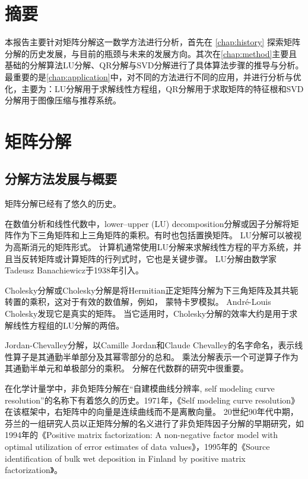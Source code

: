 \documentclass{ctexrep}
\begin{document}
\chapter{摘要}
本报告主要针对矩阵分解这一数学方法进行分析，首先在 \autoref{chap:history} 探索矩阵分解的历史发展，与目前的瓶颈与未来的发展方向。其次在\autoref{chap:method}主要且基础的分解算法LU分解、QR分解与SVD分解进行了具体算法步骤的推导与分析。最重要的是\autoref{chap:application}中，对不同的方法进行不同的应用，并进行分析与优化，主要为：LU分解用于求解线性方程组，QR分解用于求取矩阵的特征根和SVD分解用于图像压缩与推荐系统。






\chapter{矩阵分解}
\label{chap:history}
\section{分解方法发展与概要}
矩阵分解已经有了悠久的历史。\cite{matrix_jiqi}

在数值分析和线性代数中，lower–upper (LU) decomposition分解或因子分解将矩阵作为下三角矩阵和上三角矩阵的乘积。有时也包括置换矩阵。 LU分解可以被视为高斯消元的矩阵形式。 计算机通常使用LU分解来求解线性方程的平方系统，并且当反转矩阵或计算矩阵的行列式时，它也是关键步骤。 LU分解由数学家Tadeusz Banachiewicz于1938年引入。

Cholesky分解或Cholesky分解是将Hermitian正定矩阵分解为下三角矩阵及其共轭转置的乘积，这对于有效的数值解，例如， 蒙特卡罗模拟。 André-Louis Cholesky发现它是真实的矩阵。 当它适用时，Cholesky分解的效率大约是用于求解线性方程组的LU分解的两倍。

Jordan-Chevalley分解，以Camille Jordan和Claude Chevalley的名字命名，表示线性算子是其通勤半单部分及其幂零部分的总和。 乘法分解表示一个可逆算子作为其通勤半单元和单极部分的乘积。 分解在代数群的研究中很重要。



在化学计量学中，非负矩阵分解在“自建模曲线分辨率, self modeling curve resolution”的名称下有着悠久的历史。1971年，《Self modeling curve resolution》 在该框架中，右矩阵中的向量是连续曲线而不是离散向量。 20世纪90年代中期，芬兰的一组研究人员以正矩阵分解的名义进行了非负矩阵因子分解的早期研究，如1994年的《Positive matrix factorization: A non-negative factor model with optimal utilization of error estimates of data values》，1995年的《Source identification of bulk wet deposition in Finland by positive matrix factorization》。
\end{document}
